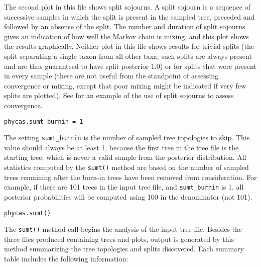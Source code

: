 \documentclass[10pt]{article}
\newcommand{\opt}[1]{{\tt \small #1}\index{#1}}		%
\begin{document}
The second plot in this file shows split sojourns. A split sojourn is a sequence of successive samples in which the split is present in the sampled tree, preceded and followed by an absense of the split. The number and duration of split sojourns gives an indication of how well the Markov chain is mixing, and this plot shows the results graphically. Neither plot in this file shows results for trivial splits (the split separating a single taxon from all other taxa; such splits are always present and are thus guaranteed to have split posterior 1.0) or for splits that were present in every sample (these are not useful from the standpoint of assessing convergence or mixing, except that poor mixing might be indicated if very few splits are plotted). See \citet{LewisLewis2005} for an example of the use of split sojourns to assess convergence. 
%
\begin{verbatim}
phycas.sumt_burnin = 1
\end{verbatim}
%
The setting \opt{sumt\_burnin} is the number of sampled tree topologies to skip. This value should always be at least 1, because the first tree in the tree file is the starting tree, which is never a valid sample from the posterior distribution. All statistics computed by the {\tt sumt()} method are based on the number of sampled trees remaining after the burn-in trees have been removed from consideration. For example, if there are 101 trees in the input tree file, and \opt{sumt\_burnin} is 1, all posterior probabilities will be computed using 100 in the denominator (not 101).
%
\begin{verbatim}
phycas.sumt()
\end{verbatim}
%
The {\tt sumt()} method call begins the analysis of the input tree file. Besides the three files produced containing trees and plots, output is generated by this method summarizing the tree topologies and splits discovered. Each summary table includes the following information:
\end{document}
